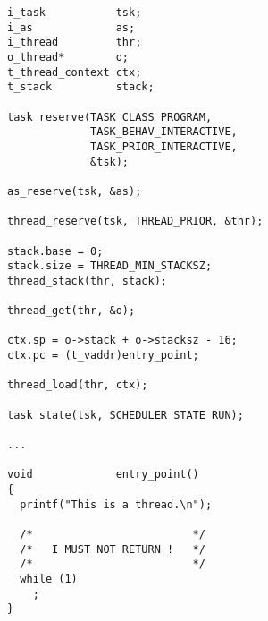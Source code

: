 \begin{verbatim}
i_task           tsk;
i_as             as;
i_thread         thr;
o_thread*        o;
t_thread_context ctx;
t_stack          stack;

task_reserve(TASK_CLASS_PROGRAM,
             TASK_BEHAV_INTERACTIVE,
             TASK_PRIOR_INTERACTIVE,
             &tsk);

as_reserve(tsk, &as);

thread_reserve(tsk, THREAD_PRIOR, &thr);

stack.base = 0;
stack.size = THREAD_MIN_STACKSZ;
thread_stack(thr, stack);

thread_get(thr, &o);

ctx.sp = o->stack + o->stacksz - 16;
ctx.pc = (t_vaddr)entry_point;

thread_load(thr, ctx);

task_state(tsk, SCHEDULER_STATE_RUN);

...

void             entry_point()
{
  printf("This is a thread.\n");

  /*                         */
  /*   I MUST NOT RETURN !   */
  /*                         */
  while (1)
    ;
}
\end{verbatim}
